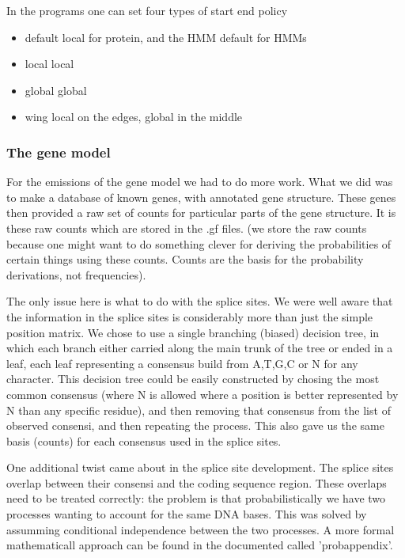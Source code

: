 \documentclass{article}
\begin{document}
In the programs one can set four types of start end policy

\begin{itemize}
\item default local for protein, and the HMM default for HMMs
\item local   local
\item global  global
\item wing    local on the edges, global in the middle
\end{itemize}


\subsubsection{The gene model}

For the emissions of the gene model we had to do more work. What we did was to 
make a database of known genes, with annotated gene structure. These 
genes then provided a raw set of counts for particular parts of the 
gene structure. It is these raw counts which are stored in the .gf files.
(we store the raw counts because one might want to do something clever
for deriving the probabilities of certain things using these counts. 
Counts are the basis for the probability derivations, not frequencies).

The only issue here is what to do with the splice sites. We were well aware
that the information in the splice sites is considerably more than just the
simple position matrix. We chose to use a single branching (biased) decision
tree, in which each branch either carried along the main trunk of the tree or
ended in a leaf, each leaf representing a consensus build from A,T,G,C or N
for any character. This decision tree could be easily constructed by chosing
the most common consensus (where N is allowed where a position is better
represented by N than any specific residue), and then removing that consensus
from the list of observed consensi, and then repeating the process. This
also gave us the same basis (counts) for each consensus used in the splice
sites.

One additional twist came about in the splice site development. The
splice sites overlap between their consensi and the coding sequence
region. These overlaps need to be treated correctly: the problem is
that probabilistically we have two processes wanting to account for
the same DNA bases. This was solved by assumming conditional
independence between the two processes. A more formal mathematicall
approach can be found in the documented called 'probappendix'.
\end{document}

